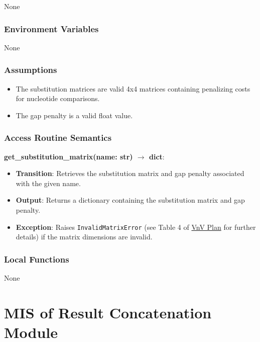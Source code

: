 \documentclass[12pt, titlepage]{article}
\begin{document}
None

\subsubsection{Environment Variables}

None

\subsubsection{Assumptions}

\begin{itemize}
    \item The substitution matrices are valid 4x4 matrices containing penalizing costs for nucleotide comparisons.
    \item The gap penalty is a valid float value.
\end{itemize}

\subsubsection{Access Routine Semantics}

\noindent \textbf{get\_substitution\_matrix(name: str) $\rightarrow$ dict}:
\begin{itemize}
    \item \textbf{Transition}: Retrieves the substitution matrix and gap penalty associated with the given name.
    \item \textbf{Output}: Returns a dictionary containing the substitution matrix and gap penalty.
    \item \textbf{Exception}: Raises \texttt{InvalidMatrixError} (see Table 4 of \href{https://github.com/UGarCil/UGarcil_capstone/blob/main/docs/VnVPlan/VnVPlan.pdf}{VnV Plan} for further details) if the matrix dimensions are invalid.
\end{itemize}

\subsubsection{Local Functions}

None

\newpage

\section{MIS of Result Concatenation Module} \label{mRC}
\end{document}
